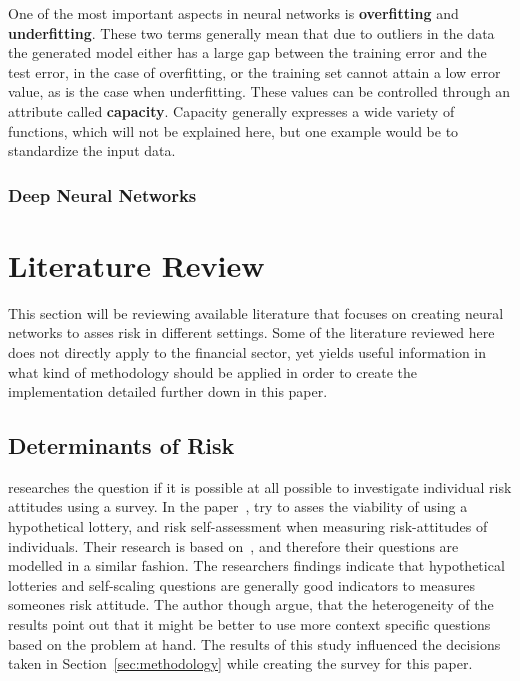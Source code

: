 \documentclass{article}
\begin{document}
One of the most important aspects in neural networks is \textbf{overfitting} and \textbf{underfitting}. These two terms generally mean that due to outliers in the data the generated model either has a large gap between the training error and the test error, in the case of overfitting, or the training set cannot attain a low error value, as is the case when underfitting. These values can be controlled through an attribute called \textbf{capacity}. Capacity generally expresses a wide variety of functions, which will not be explained here, but one example would be to standardize the input data.

\subsubsection{Deep Neural Networks}
\section{Literature Review}
\label{sec:literature_review}

This section will be reviewing available literature that focuses on creating neural networks to asses risk in different settings. Some of the literature reviewed here does not directly apply to the financial sector, yet yields useful information in what kind of methodology should be applied in order to create the implementation detailed further down in this paper.

\subsection{Determinants of Risk}
\label{sub:determinants_riks}

\cite{dp4807.pdf} researches the question if it is possible at all possible to investigate individual risk attitudes using a survey. In the paper~\cite{dp4807.pdf}, try to asses the viability of using a hypothetical lottery, and risk self-assessment when measuring risk-attitudes of individuals. Their research is based on~\cite{individualRiskAttitudes}, and therefore their questions are modelled in a similar fashion. The researchers findings indicate that hypothetical lotteries and self-scaling questions are generally good indicators to measures someones risk attitude. The author though argue, that the heterogeneity of the results point out that it might be better to use more context specific questions based on the problem at hand. The results of this study influenced the decisions taken in Section~\ref{sec:methodology} while creating the survey for this paper.
\end{document}
